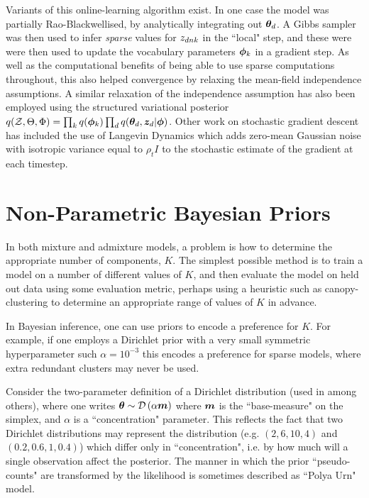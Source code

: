 Variants of this online-learning algorithm exist. In one case\cite{Mimno2012a} the model was partially Rao-Blackwellised, by analytically integrating out ${ \bm \theta_d }$. A Gibbs sampler was then used to infer \emph{sparse} values for ${ z_{dnk} }$ in the ``local" step, and these were were then used to update the vocabulary parameters ${ \bm \phi }_k$ in a gradient step. As well as the computational benefits of being able to use sparse computations throughout, this also helped convergence by relaxing the mean-field independence assumptions. A similar relaxation of the independence assumption has also been employed\cite{Hoffman2015} using the structured variational posterior \\
$q({ \mathcal{Z} }, \Theta, \Phi) = \prod_k q({ \bm \phi }_k)\prod_d q({ \bm \theta_d }, \bm z_d | { \bm \phi })$. Other work on stochastic gradient descent has included the use of Langevin Dynamics\cite{Welling2011} which adds zero-mean Gaussian noise with isotropic variance equal to $\rho_t I$ to the stochastic estimate of the gradient at each timestep.%



\section{Non-Parametric Bayesian Priors}
\label{sec:chap1:DPs}
In both mixture and admixture models, a problem is how to determine the appropriate number of components, $K$. The simplest possible method is to train a model on a number of different values of $K$, and then evaluate the model on held out data using some evaluation metric, perhaps using a heuristic such as canopy-clustering\cite{McCallum2000} to determine an appropriate range of values of $K$ in advance.

In Bayesian inference, one can use priors to encode a preference for $K$. For example, if one employs a Dirichlet prior with a very small symmetric hyperparameter such $\alpha = 10^{-3}$ this encodes a preference for sparse models, where extra redundant clusters may never be used. 

Consider the two-parameter definition of a Dirichlet distribution (used in \cite{MacKay1995}\cite{Wallach2006}\cite{Wallach2009a} among others), where one writes $\bm \theta \sim \mathcal{D} \left( {\alpha \bm m} \right)$ where $\bm m$ is the ``base-measure" on the simplex, and $\alpha$ is a ``concentration" parameter. This reflects the fact that two Dirichlet distributions may represent the distribution (e.g. $(2, 6, 10, 4)$ and $(0.2, 0.6, 1, 0.4)$) which differ only in ``concentration", i.e. by how much will a single observation affect the posterior. The manner in which the prior ``pseudo-counts" are transformed by the likelihood is sometimes described as ``Polya Urn" model.

